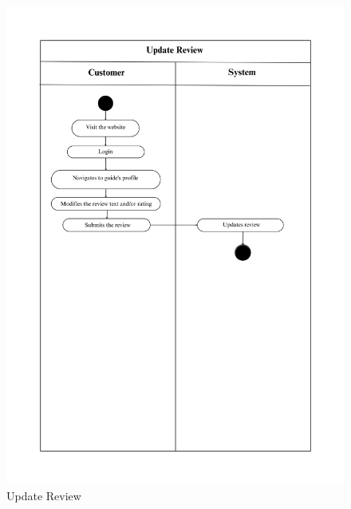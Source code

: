 \begin{figure}[h]
    \centering
    \includegraphics[width=1\textwidth]{Images/Activity Diagrams/28 Update Review.png}
    \caption{Update Review}
    \label{fig:activity-update-review}
\end{figure}

